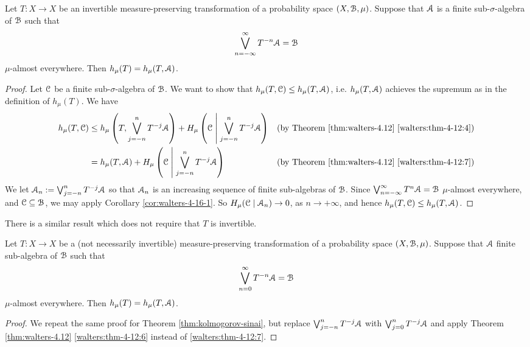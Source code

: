 \begin{theorem} \label{thm:kolmogorov-sinai}
	Let $T : X \to X$ be an invertible measure-preserving transformation of a probability space $(X, \mathcal{B}, \mu)$. Suppose that $\mathcal{A}$ is a finite sub-$\sigma$-algebra of $\mathcal{B}$ such that
	\[
		\bigvee_{n = -\infty}^\infty{T^{-n}{\mathcal{A}}} = \mathcal{B}
	\]
	$\mu$-almost everywhere. Then $h_\mu(T) = h_\mu(T, \mathcal{A})$.
	
	\begin{proof}
		Let $\mathcal{C}$ be a finite sub-$\sigma$-algebra of $\mathcal{B}$. We want to show that $h_\mu(T, \mathcal{C}) \leq h_\mu(T, \mathcal{A})$, i.e. $h_\mu(T, \mathcal{A})$ achieves the supremum as in the definition of $h_\mu(T)$. We have
		\begin{align*}
			h_\mu(T, \mathcal{C}) &\leq h_\mu\left(T, \bigvee_{j = -n}^n{T^{-j}{\mathcal{A}}}\right) + H_\mu\left(\mathcal{C} \mathrel{}\middle|\mathrel{} \bigvee_{j = -n}^n{T^{-j}{\mathcal{A}}}\right) & \text{(by Theorem \ref{thm:walters-4.12} \ref{walters:thm-4-12:4})} \\
				&= h_\mu(T, \mathcal{A}) + H_\mu\left(\mathcal{C} \mathrel{}\middle|\mathrel{} \bigvee_{j = -n}^n{T^{-j}{\mathcal{A}}} \right) & \text{(by Theorem \ref{thm:walters-4.12} \ref{walters:thm-4-12:7})}
		\end{align*}
		We let $\mathcal{A}_n := \bigvee_{j = -n}^n{T^{-j}{\mathcal{A}}}$ so that $\mathcal{A}_n$ is an increasing sequence of finite sub-algebras of $\mathcal{B}$. Since $\bigvee_{n = -\infty}^\infty{T^n{\mathcal{A}}} = \mathcal{B}$ $\mu$-almost everywhere, and $\mathcal{C} \subseteq \mathcal{B}$, we may apply Corollary \ref{cor:walters-4-16-1}. So $H_\mu(\mathcal{C} \mid \mathcal{A}_n) \to 0$, as $n \to +\infty$, and hence $h_\mu(T, \mathcal{C}) \leq h_\mu(T, \mathcal{A})$.
	\end{proof}
\end{theorem}

There is a similar result which does not require that $T$ is invertible.

\begin{theorem} \label{thm:walters-4-18}
	Let $T : X \to X$ be a (not necessarily invertible) measure-preserving transformation of a probability space $(X, \mathcal{B}, \mu)$. Suppose that $\mathcal{A}$ finite sub-algebra of $\mathcal{B}$ such that
	\[
		\bigvee_{n = 0}^\infty{T^{-n}{\mathcal{A}}} = \mathcal{B}
	\]
	$\mu$-almost everywhere. Then $h_\mu(T) = h_\mu(T, \mathcal{A})$.
	
	\begin{proof}
		We repeat the same proof for Theorem \ref{thm:kolmogorov-sinai}, but replace $\bigvee_{j = -n}^n{T^{-j}{\mathcal{A}}}$ with $\bigvee_{j = 0}^n{T^{-j}{\mathcal{A}}}$ and apply Theorem \ref{thm:walters-4.12} \ref{walters:thm-4-12:6} instead of \ref{walters:thm-4-12:7}.
	\end{proof}
\end{theorem}

